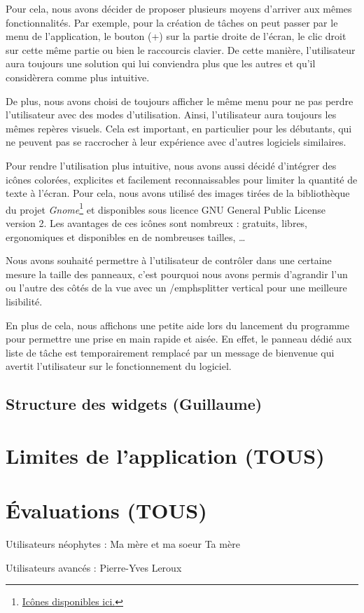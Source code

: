 		Pour cela, nous avons décider de proposer plusieurs moyens d'arriver aux mêmes fonctionnalités. Par exemple, pour la création de tâches on peut passer par le menu de l'application, le bouton (+) sur la partie droite de l'écran, le clic droit sur cette même partie ou bien le raccourcis clavier. De cette manière, l'utilisateur aura toujours une solution qui lui conviendra plus que les autres et qu'il considèrera comme plus intuitive.
		
		De plus, nous avons choisi de toujours afficher le même menu pour ne pas perdre l'utilisateur avec des \og modes \fg d'utilisation. Ainsi, l'utilisateur aura toujours les mêmes repères visuels. Cela est important, en particulier pour les débutants, qui ne peuvent pas se raccrocher à leur expérience avec d'autres logiciels similaires.\newline
		
		Pour rendre l'utilisation plus intuitive, nous avons aussi décidé d'intégrer des icônes colorées, explicites et facilement reconnaissables pour limiter la quantité de texte à l'écran. Pour cela, nous avons utilisé des images tirées de la bibliothèque du projet \emph{Gnome}\footnote{\href{https://commons.wikimedia.org/wiki/GNOME_Desktop_icons}{Icônes disponibles ici.}} et disponibles sous licence GNU General Public License version 2. Les avantages de ces icônes sont nombreux : gratuits, libres, ergonomiques et disponibles en de nombreuses tailles, \dots \newline
		
		Nous avons souhaité permettre à l'utilisateur de contrôler dans une certaine mesure la taille des panneaux, c'est pourquoi nous avons permis d'agrandir l'un ou l'autre des côtés de la vue avec un /emph{splitter} vertical pour une meilleure lisibilité.
		
		En plus de cela, nous affichons une petite aide lors du lancement du programme pour permettre une prise en main rapide et aisée. En effet, le panneau dédié aux liste de tâche est temporairement remplacé par un message de bienvenue qui avertit l'utilisateur sur le fonctionnement du logiciel.
		
		
	\section{Structure des widgets (Guillaume)}
		
		
	
\chapter{Limites de l'application (TOUS)}
	


\chapter{Évaluations (TOUS)}
	
	Utilisateurs néophytes :
		Ma mère et ma soeur
		Ta mère
		
	Utilisateurs avancés :
		Pierre-Yves
		Leroux

